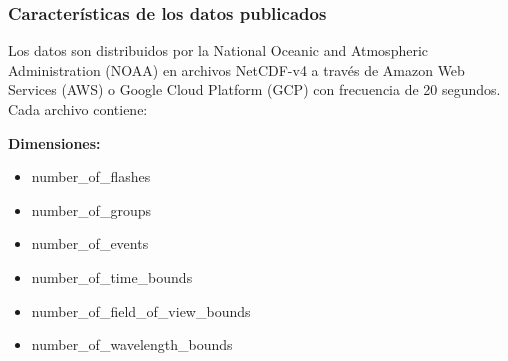 \subsubsection{Características de los datos publicados}
Los datos son distribuidos por la National Oceanic and Atmospheric 
Administration (NOAA) en archivos NetCDF-v4 a través de Amazon Web Services
(AWS) o Google Cloud Platform (GCP) con frecuencia de 20 segundos.
Cada archivo contiene:

\textbf{Dimensiones: }
\begin{itemize}
  \item number\_of\_flashes
  \item number\_of\_groups
  \item number\_of\_events
  \item number\_of\_time\_bounds
  \item number\_of\_field\_of\_view\_bounds
  \item number\_of\_wavelength\_bounds
\end{itemize}

